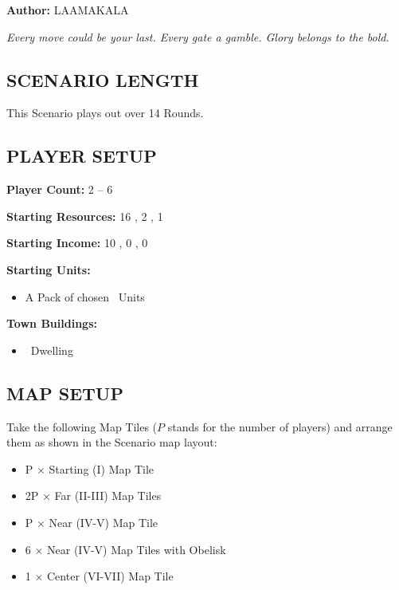 
\begin{multicols}{2}

\textbf{Author:} LAAMAKALA

\textit{Every move could be your last. Every gate a gamble. Glory belongs to the bold.}

\subsection*{\MakeUppercase{Scenario Length}}
This Scenario plays out over 14 Rounds.

\subsection*{\MakeUppercase{Player Setup}}
\textbf{Player Count:} 2 -- 6

\textbf{Starting Resources:} 16 , 2 , 1 

\textbf{Starting Income:} 10 , 0 , 0 

\textbf{Starting Units:}

\begin{itemize}
  \item A Pack of chosen \bronze\ Units
\end{itemize}

\textbf{Town Buildings:}
\begin{itemize}
  \item \bronze\ Dwelling
\end{itemize}

\subsection*{\MakeUppercase{Map Setup}}
Take the following Map Tiles ($P$ stands for the number of players) and arrange them as shown in the Scenario map layout:

\begin{itemize}
  \item P × Starting (I) Map Tile
  \item 2P × Far (II-III) Map Tiles
  \item P × Near (IV-V) Map Tile
  \item 6 × Near (IV-V) Map Tiles with Obelisk
  \item 1 × Center (VI-VII) Map Tile
\end{itemize}


\end{multicols}
